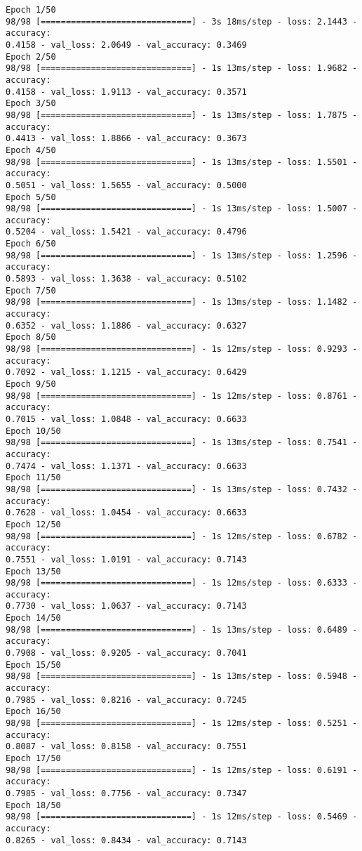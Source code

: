 \begin{verbatim}
Epoch 1/50
98/98 [==============================] - 3s 18ms/step - loss: 2.1443 - accuracy: 
0.4158 - val_loss: 2.0649 - val_accuracy: 0.3469
Epoch 2/50
98/98 [==============================] - 1s 13ms/step - loss: 1.9682 - accuracy: 
0.4158 - val_loss: 1.9113 - val_accuracy: 0.3571
Epoch 3/50
98/98 [==============================] - 1s 13ms/step - loss: 1.7875 - accuracy:
0.4413 - val_loss: 1.8866 - val_accuracy: 0.3673
Epoch 4/50
98/98 [==============================] - 1s 13ms/step - loss: 1.5501 - accuracy:
0.5051 - val_loss: 1.5655 - val_accuracy: 0.5000
Epoch 5/50
98/98 [==============================] - 1s 13ms/step - loss: 1.5007 - accuracy:
0.5204 - val_loss: 1.5421 - val_accuracy: 0.4796
Epoch 6/50
98/98 [==============================] - 1s 13ms/step - loss: 1.2596 - accuracy:
0.5893 - val_loss: 1.3638 - val_accuracy: 0.5102
Epoch 7/50
98/98 [==============================] - 1s 13ms/step - loss: 1.1482 - accuracy:
0.6352 - val_loss: 1.1886 - val_accuracy: 0.6327
Epoch 8/50
98/98 [==============================] - 1s 12ms/step - loss: 0.9293 - accuracy:
0.7092 - val_loss: 1.1215 - val_accuracy: 0.6429
Epoch 9/50
98/98 [==============================] - 1s 12ms/step - loss: 0.8761 - accuracy:
0.7015 - val_loss: 1.0848 - val_accuracy: 0.6633
Epoch 10/50
98/98 [==============================] - 1s 13ms/step - loss: 0.7541 - accuracy:
0.7474 - val_loss: 1.1371 - val_accuracy: 0.6633
Epoch 11/50
98/98 [==============================] - 1s 13ms/step - loss: 0.7432 - accuracy:
0.7628 - val_loss: 1.0454 - val_accuracy: 0.6633
Epoch 12/50
98/98 [==============================] - 1s 12ms/step - loss: 0.6782 - accuracy:
0.7551 - val_loss: 1.0191 - val_accuracy: 0.7143
Epoch 13/50
98/98 [==============================] - 1s 12ms/step - loss: 0.6333 - accuracy:
0.7730 - val_loss: 1.0637 - val_accuracy: 0.7143
Epoch 14/50
98/98 [==============================] - 1s 13ms/step - loss: 0.6489 - accuracy:
0.7908 - val_loss: 0.9205 - val_accuracy: 0.7041
Epoch 15/50
98/98 [==============================] - 1s 13ms/step - loss: 0.5948 - accuracy:
0.7985 - val_loss: 0.8216 - val_accuracy: 0.7245
Epoch 16/50
98/98 [==============================] - 1s 12ms/step - loss: 0.5251 - accuracy:
0.8087 - val_loss: 0.8158 - val_accuracy: 0.7551
Epoch 17/50
98/98 [==============================] - 1s 12ms/step - loss: 0.6191 - accuracy:
0.7985 - val_loss: 0.7756 - val_accuracy: 0.7347
Epoch 18/50
98/98 [==============================] - 1s 12ms/step - loss: 0.5469 - accuracy:
0.8265 - val_loss: 0.8434 - val_accuracy: 0.7143

\end{verbatim}
